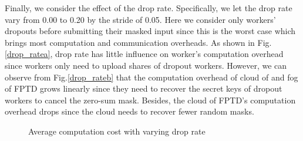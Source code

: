\documentclass[conference,a4paper]{IEEEtran}
\begin{document}
    Finally, we consider the effect of the drop rate. Specifically, we let the drop rate vary from 0.00 to 0.20 by the stride of 0.05. Here we consider only workers' dropouts before submitting their masked input since this is the worst case which brings most computation and communication overheads. As shown in Fig.\ref{drop_ratea}, drop rate has little influence on worker's computation overhead since workers only need to upload shares of dropout workers. However, we can observe from Fig.\ref{drop_rateb} that the computation overhead of cloud of \cite{rtpt} and fog of FPTD grows linearly since they need to recover the secret keys of dropout workers to cancel the zero-sum mask. Besides, the cloud of FPTD's computation overhead drops since the cloud needs to recover fewer random masks.
    \begin{figure}[!ht]
        \centering
        \caption{Average computation cost with varying drop rate}
        \label{drop_rate}
    \end{figure}
\end{document}
